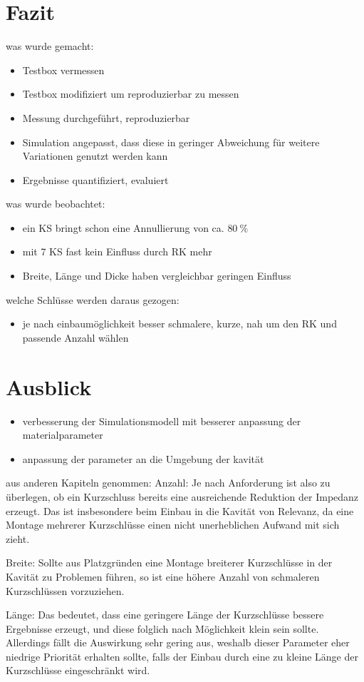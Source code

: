 \section{Fazit}
was wurde gemacht:
\begin{itemize}
	\item Testbox vermessen
	\item Testbox modifiziert um reproduzierbar zu messen
	\item Messung durchgef\"uhrt, reproduzierbar
	\item Simulation angepasst, dass diese in geringer Abweichung f\"ur weitere Variationen genutzt werden kann
	\item Ergebnisse quantifiziert, evaluiert
\end{itemize}
was wurde beobachtet:
\begin{itemize}
    \item ein KS bringt schon eine Annullierung von ca. $80~\%$
    \item mit 7 KS fast kein Einfluss durch RK mehr
    \item Breite, Länge und Dicke haben vergleichbar geringen Einfluss
\end{itemize}
welche Schlüsse werden daraus gezogen:
\begin{itemize}
    \item je nach einbaumöglichkeit besser schmalere, kurze, nah um den RK und passende Anzahl wählen
\end{itemize}

\section{Ausblick}
\begin{itemize}
    \item verbesserung der Simulationsmodell mit besserer anpassung der materialparameter
    \item anpassung der parameter an die Umgebung der kavität
    
\end{itemize}

aus anderen Kapiteln genommen:
Anzahl:
Je nach Anforderung ist also zu \"uberlegen, ob ein Kurzschluss bereits eine ausreichende Reduktion der Impedanz erzeugt. Das ist insbesondere beim Einbau in die Kavit\"at von Relevanz, da eine Montage mehrerer Kurzschl\"usse einen nicht unerheblichen Aufwand mit sich zieht. 

Breite:
Sollte aus Platzgr\"unden eine Montage breiterer Kurzschl\"usse in der Kavit\"at zu Problemen f\"uhren, so ist eine h\"ohere Anzahl von schmaleren Kurzschl\"ussen vorzuziehen. 

Länge:
Das bedeutet, dass eine geringere L\"ange der Kurzschl\"usse bessere Ergebnisse erzeugt, und diese folglich nach M\"oglichkeit klein sein sollte. Allerdings f\"allt die Auswirkung sehr gering aus, weshalb dieser Parameter eher niedrige Priorit\"at erhalten sollte, falls der Einbau durch eine zu kleine L\"ange der Kurzschl\"usse eingeschr\"ankt wird.